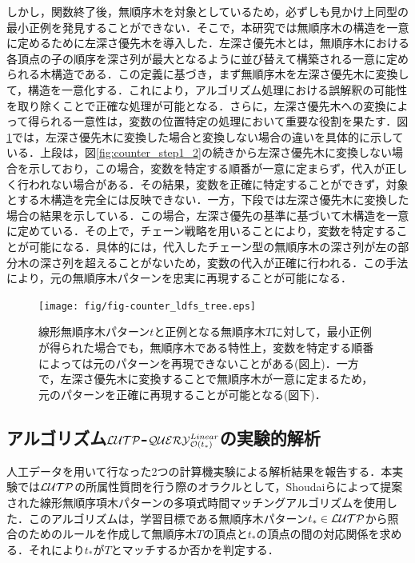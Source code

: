 しかし，関数終了後，無順序木を対象としているため，必ずしも見かけ上同型の最小正例を発見することができない．そこで，本研究では無順序木の構造を一意に定めるために左深さ優先木を導入した．左深さ優先木とは，無順序木における各頂点の子の順序を深さ列が最大となるように並び替えて構築される一意に定められる木構造である．この定義に基づき，まず無順序木を左深さ優先木に変換して，構造を一意化する．これにより，アルゴリズム処理における誤解釈の可能性を取り除くことで正確な処理が可能となる．さらに，左深さ優先木への変換によって得られる一意性は，変数の位置特定の処理において重要な役割を果たす．図\ref{fig:counter_ldfs_tree}では，左深さ優先木に変換した場合と変換しない場合の違いを具体的に示している．上段は，図\ref{fig:counter_step1_2}の続きから左深さ優先木に変換しない場合を示しており，この場合，変数を特定する順番が一意に定まらず，代入が正しく行われない場合がある．その結果，変数を正確に特定することができず，対象とする木構造を完全には反映できない．一方，下段では左深さ優先木に変換した場合の結果を示している．この場合，左深さ優先の基準に基づいて木構造を一意に定めている．その上で，チェーン戦略を用いることにより，変数を特定することが可能になる．具体的には，代入したチェーン型の無順序木の深さ列が左の部分木の深さ列を超えることがないため，変数の代入が正確に行われる．この手法により，元の無順序木パターンを忠実に再現することが可能になる．

\begin{figure}[tb]
  \centering
  \texttt{[image: fig/fig-counter\_ldfs\_tree.eps]}
  \caption{線形無順序木パターン$t$と正例となる無順序木$T$に対して，最小正例が得られた場合でも，無順序木である特性上，変数を特定する順番によっては元のパターンを再現できないことがある(図上)．一方で，左深さ優先木に変換することで無順序木が一意に定まるため，元のパターンを正確に再現することが可能となる(図下)．}\label{fig:counter_ldfs_tree}
\end{figure}

\subsection{アルゴリズム${\cal LUTP}$-${\cal QUERY}_{{\cal O}(t_{\ast})}^{Linear}$の実験的解析}
人工データを用いて行なった2つの計算機実験による解析結果を報告する．本実験では${\cal LUTP}$の所属性質問を行う際のオラクルとして，Shoudaiら\cite{shoudai-ieice2018}によって提案された線形無順序項木パターンの多項式時間マッチングアルゴリズムを使用した．このアルゴリズムは，学習目標である無順序木パターン$t_\ast\in{\cal LUTP}$から照合のためのルールを作成して無順序木$T$の頂点と$t_\ast$の頂点の間の対応関係を求める．それにより$t_\ast$が$T$とマッチするか否かを判定する．

